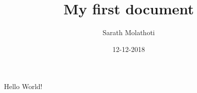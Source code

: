 \documentclass{article}
\title{My first document}
\date{12-12-2018}
\author{Sarath Molathoti}
\begin{document}
  \maketitle
  \newpage

  Hello World!
\end{document}
